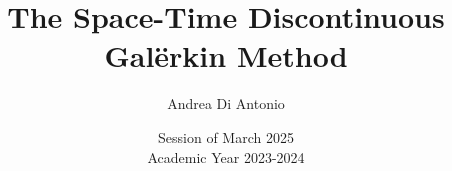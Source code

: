
\newcommand{\documenttitle}{The Space-Time Discontinuous Galërkin Method}
\newcommand{\brokendocumenttitle}{The Space-Time \\ Discontinuous Galërkin Method}
\newcommand{\documentsubtitle}{Convection-Diffusion-Reaction Problems}

\newcommand{\documentauthor}{Andrea Di Antonio}
\newcommand{\documentdate}{Session of March 2025 \\ Academic Year 2023-2024}
\newcommand{\logo}{title/logo_bw.pdf}

\author{\documentauthor}
\title{\documenttitle}
\date{\documentdate}